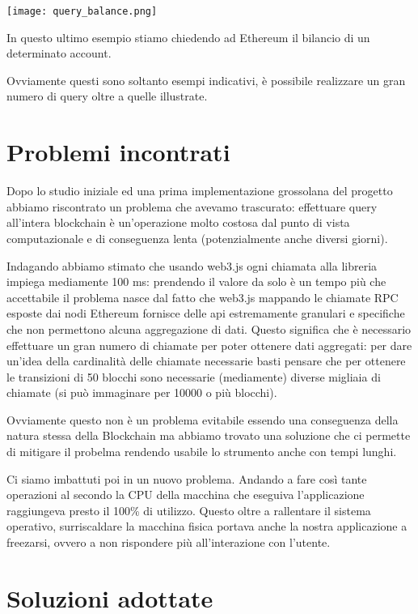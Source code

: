 \begin{center}
  \texttt{[image: query\_balance.png]}
\end{center}
In questo ultimo esempio stiamo chiedendo ad Ethereum il bilancio di un determinato account.

Ovviamente questi sono soltanto esempi indicativi, è possibile realizzare un gran numero di query oltre a quelle illustrate.

\section{Problemi incontrati}
Dopo lo studio iniziale ed una prima implementazione grossolana del progetto abbiamo riscontrato un problema che avevamo trascurato:
effettuare query all'intera blockchain è un'operazione molto costosa dal punto di vista computazionale e di conseguenza lenta (potenzialmente anche diversi giorni).

Indagando abbiamo stimato che usando web3.js ogni chiamata alla libreria impiega mediamente 100 ms:
prendendo il valore da solo è un tempo più che accettabile il problema nasce dal fatto che web3.js mappando le chiamate RPC esposte dai nodi Ethereum
fornisce delle api estremamente granulari e specifiche che non permettono alcuna aggregazione di dati.
Questo significa che è necessario effettuare un gran numero di chiamate per poter ottenere dati aggregati:
per dare un'idea della cardinalità delle chiamate necessarie basti pensare che per ottenere le transizioni di 50 blocchi sono necessarie (mediamente) diverse migliaia di chiamate (si può immaginare per 10000 o più blocchi).

Ovviamente questo non è un problema evitabile essendo una conseguenza della natura stessa della Blockchain ma abbiamo trovato una soluzione che ci permette di mitigare il probelma rendendo usabile lo strumento anche con tempi lunghi.

\vspace{0.5cm}

Ci siamo imbattuti poi in un nuovo problema. Andando a fare così tante operazioni al secondo la CPU della macchina che eseguiva l'applicazione raggiungeva presto il 100\% di utilizzo.
Questo oltre a rallentare il sistema operativo, surriscaldare la macchina fisica portava anche la nostra applicazione a freezarsi, ovvero a non rispondere più all'interazione con l'utente.

\section{Soluzioni adottate}

